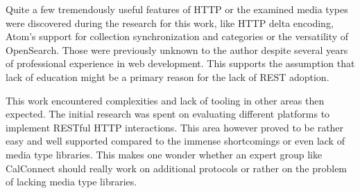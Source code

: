 \documentclass[11pt,a4paper,headsepline,twoside]{scrartcl}		%
\begin{document}
Quite a few tremendously useful features of HTTP or the examined media types were
discovered during the research for this work, like HTTP delta encoding, Atom's
support for collection synchronization and categories or the versatility of
OpenSearch. Those were previously unknown to the author despite several years of
professional experience in web development. This supports the assumption that
lack of education might be a primary reason for the lack of REST adoption.

This work encountered complexities and lack of tooling in other areas then
expected. The initial research was spent on evaluating different platforms to
implement RESTful HTTP interactions. This area however proved to be rather easy
and well supported compared to the immense shortcomings or even lack of
media type libraries. This makes one wonder whether an expert group like
CalConnect should really work on additional protocols or rather on the problem
of lacking media type libraries.

\newpage
{}

\end{document}

